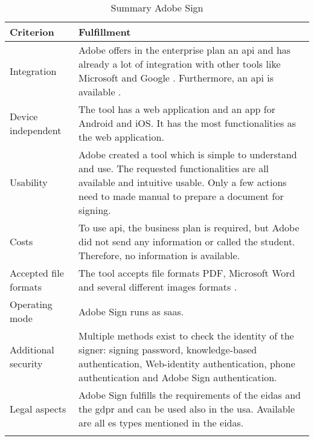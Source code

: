 	\begin{longtable}{|p{4cm}|p{10cm}|} \hline
		\rowcolor{Gray}Criterion & Fulfillment \\ \hline
		Integration & Adobe offers in the enterprise plan an \gls{api} and has already a lot of integration with other tools like Microsoft and Google \parencite{adobesign2018integration,adobesign2018info}. Furthermore, an \gls{api} is available \parencite{adobesign2018api}. \\ \hline
		Device independent & The tool has a web application and an \gls{app} for Android and iOS. It has the most functionalities as the web application. \\ \hline
		Usability & Adobe created a tool which is simple to understand and use. The requested functionalities are all available and intuitive usable. Only a few actions need to made manual to prepare a document for signing. \\ \hline
		Costs & To use \gls{api}, the business plan is required, but Adobe did not send any information or called the student. Therefore, no information is available.\\ \hline
		Accepted file formats & The tool accepts file formats \gls{PDF}, Microsoft Word and several different images formats \parencite{adobesign2018info}. \\ \hline
		Operating mode & Adobe Sign runs as \gls{saas}. \parencite{adobesign2016} \\ \hline
		Additional security & Multiple methods exist to check the identity of the signer: signing password, knowledge-based authentication, Web-identity authentication, phone authentication and Adobe Sign authentication. \parencite{adobesign2018security} \\ \hline
		Legal aspects & Adobe Sign fulfills the requirements of the \gls{eidas} and the \gls{gdpr} and can be used also in the \gls{usa}. Available are all \gls{es} types mentioned in the \gls{eidas}. \parencite{adobesign2018legal,adobesign2018gdpr, adobesign2018es}\\ \hline
	\caption{Summary Adobe Sign}
	\label{tool:tab:adobesign}
	\end{longtable}

